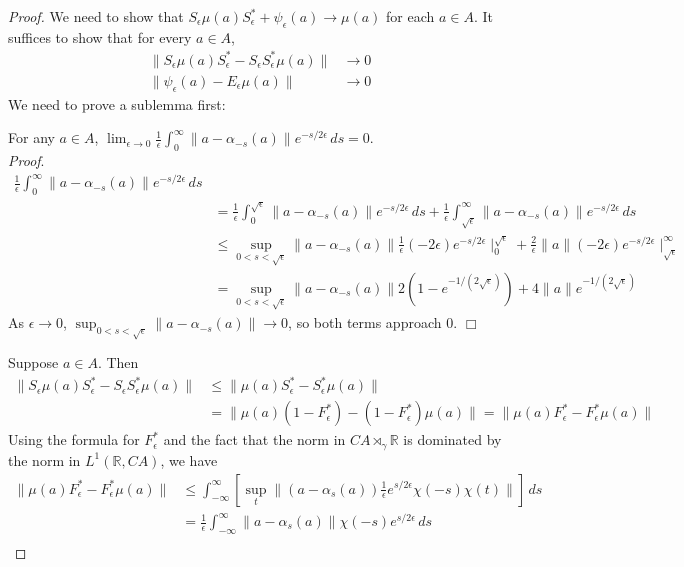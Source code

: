 \documentclass{book}
\begin{document}
\begin{proof}
  We need to show that \(S_\epsilon\mu(a)S^*_\epsilon+\psi_\epsilon(a)\rightarrow\mu(a)\) for each \(a\in A\).
  It suffices to show that for every \(a\in A\),
  \begin{align*}
    \|S_\epsilon\mu(a)S_\epsilon^*-S_\epsilon S_\epsilon^*\mu(a)\|&\rightarrow0\\
    \|\psi_\epsilon(a)-E_\epsilon\mu(a)\|&\rightarrow0
  \end{align*}
  We need to prove a sublemma first:\par
  For any \(a\in A\), \(\lim_{\epsilon\to0}\frac{1}{\epsilon}\int_0^\infty\|a-\alpha_{-s}(a)\|e^{-s/2\epsilon}\,ds=0\).\\
  \textit{Proof}.
  \begin{align*}
    \frac{1}{\epsilon}\int_0^\infty\|a-\alpha_{-s}(a)\|e^{-s/2\epsilon}\,ds&\\
    &=\frac{1}{\epsilon}\int_0^{\sqrt{\epsilon}}\|a-\alpha_{-s}(a)\|e^{-s/2\epsilon}\,ds+\frac{1}{\epsilon}\int_{\sqrt{\epsilon}}^\infty\|a-\alpha_{-s}(a)\|e^{-s/2\epsilon}\,ds\\
    &\leq\sup_{0<s<\sqrt{\epsilon}}\|a-\alpha_{-s}(a)\|\frac{1}{\epsilon}(-2\epsilon)e^{-s/2\epsilon}\mid_0^{\sqrt{\epsilon}}+\frac{2}{\epsilon}\|a\|(-2\epsilon)e^{-s/2\epsilon}\mid_{\sqrt{\epsilon}}^\infty\\
    &=\sup_{0<s<\sqrt{\epsilon}}\|a-\alpha_{-s}(a)\|2(1-e^{-1/(2\sqrt{\epsilon})})+4\|a\|e^{-1/(2\sqrt{\epsilon})}
  \end{align*}
  As \(\epsilon\rightarrow0\), \(\sup_{0<s<\sqrt{\epsilon}}\|a-\alpha_{-s}(a)\|\rightarrow0\), so both terms approach \(0\). $\Box$\par
  Suppose \(a\in A\). Then 
  \begin{align*}
    \|S_\epsilon\mu(a)S_\epsilon^*- S_\epsilon S_\epsilon^*\mu(a)\|&\leq\|\mu(a)S_\epsilon^*-S_\epsilon^*\mu(a)\|\\
    &=\|\mu(a)(1-F_\epsilon^*)-(1-F_\epsilon^*)\mu(a)\|=\|\mu(a)F_\epsilon^*-F_\epsilon^*\mu(a)\|
  \end{align*}
  Using the formula for \(F_\epsilon^*\) and the fact that the norm in \(CA\rtimes_\gamma \mathbb{R}\) is dominated by the norm in \(L^1(\mathbb{R},CA)\),
  we have
  \begin{align*}
    \|\mu(a)F_\epsilon^*-F_\epsilon^*\mu(a)\|&\leq\int_{-\infty}^\infty[\sup_t\|(a-\alpha_s(a))\frac{1}{\epsilon}e^{s/2\epsilon}\chi(-s)\chi(t)\|]\,ds\\
    &=\frac{1}{\epsilon}\int_{-\infty}^\infty\|a-\alpha_s(a)\|\chi(-s)e^{s/2\epsilon}\,ds\\

\end{align*}
\end{proof}
\end{document}
